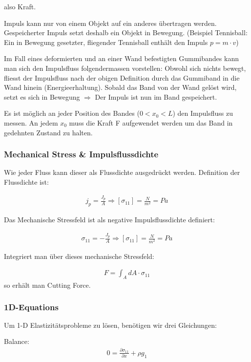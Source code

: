 \documentclass[a4paper, 10pt]{scrartcl}
\begin{document}
also Kraft.

Impuls kann nur von einem Objekt auf ein anderes übertragen werden.
Gespeicherter Impuls setzt deshalb ein Objekt in Bewegung. (Beispiel
Tennisball: Ein in Bewegung gesetzter, fliegender Tennisball enthält den Impuls
$p=m \cdot v$)

Im Fall eines deformierten und an einer Wand befestigten Gummibandes kann man
sich den Impulsfluss folgendermassen vorstellen: Obwohl sich nichts bewegt,
fliesst der Impulsfluss nach der obigen Definition durch das Gummiband in die
Wand hinein (Energieerhaltung). Sobald das Band von der Wand gelöst wird, setzt
es sich in Bewegung $\Rightarrow$ Der Impuls ist nun im Band gespeichert. 

Es ist möglich an jeder Position des Bandes ($0<x_0<L$) den Impulsfluss zu
messen. An jedem $x_0$ muss die Kraft F aufgewendet werden um das Band in
gedehnten Zustand zu halten.

\subsubsection{Mechanical Stress \& Impulsflussdichte}
Wie jeder Fluss kann dieser als Flussdichte ausgedrückt werden. Definition der
Flussdichte ist:


\begin{align}
	j_p = \frac{J_p}{A} \Rightarrow [\sigma_{11}]= \frac{N}{m^2} = Pa
\end{align}

Das Mechanische Stressfeld ist als negative Impulsflussdichte definiert:

\begin{align}
	\sigma_{11}=- \frac{J_p}{A} \Rightarrow [\sigma_{11}]= \frac{N}{m^2} = Pa
\end{align}

Integriert man über dieses mechanische Stressfeld:

\begin{align}
	F=\int_A dA \cdot \sigma_{11}
\end{align}
so erhält man \flqq Cutting Force\frqq. 
\subsubsection{1D-Equations}

Um 1-D Elastizitätsprobleme zu lösen, benötigen wir drei Gleichungen:

Balance:
\begin{align}
	0=\frac{\partial \sigma_{11}}{\partial x}+\rho g_1
\end{align}
\end{document}
